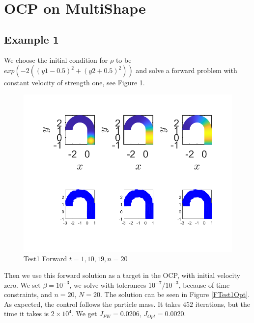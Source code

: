 \documentclass[11pt, a4paper]{article}
\theoremstyle{definition}
\begin{document}
    
    
    \section{OCP on MultiShape}
    
    \subsection{Example 1}
    We choose the initial condition for $\rho$ to be $exp(-2((y1 - 0.5 )^2 + (y2 + 0.5)^2))$ and solve a forward problem with constant velocity of strength one, see Figure \ref{FTest1FW}.
    \begin{figure}[h]
    	\centering
    	\includegraphics[scale=0.7]{Test10FW.png}
    	\caption{Test1 Forward $t =1, 10, 19, n = 20$} 
    	\label{FTest1FW}
    \end{figure}
    Then we use this forward solution as a target in the OCP, with initial velocity zero. We set $\beta = 10^{-3}$, we solve with tolerances $10^{-7}/ 10^{-3}$, because of time constraints, and $n = 20$, $N = 20$. The solution can be seen in Figure \ref{FTest1Opt}. As expected, the control follows the particle mass. It takes $452$ iterations, but the time it takes is $2 \times 10^4$. We get $J_{FW} = 0.0206$, $J_{Opt} = 0.0020$. 
\end{document}
